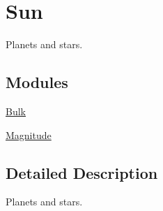 \hypertarget{group___e_g_x_phys-_constants-_astrophysics-_solar_system-_sun}{}\section{Sun}
\label{group___e_g_x_phys-_constants-_astrophysics-_solar_system-_sun}


Planets and stars.  


\subsection*{Modules}
\begin{DoxyCompactItemize}
\item 
\mbox{\hyperlink{group___e_g_x_phys-_constants-_astrophysics-_solar_system-_sun-_bulk}{Bulk}}
\item 
\mbox{\hyperlink{group___e_g_x_phys-_constants-_astrophysics-_solar_system-_sun-_magnitude}{Magnitude}}
\end{DoxyCompactItemize}


\subsection{Detailed Description}
Planets and stars. 

